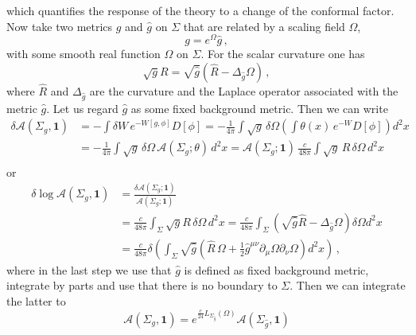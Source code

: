 \documentclass[11pt,a4paper]{article}
\numberwithin{equation}{section}
\newcommand{\one}{\mathbf{1}} %
\begin{document}
%
which quantifies the response of the theory to a change of the conformal factor. Now take two metrics $g$ and $\hat{g}$ on $\Sigma$ that are related by a scaling field $\Omega$, 
%
\begin{equation}\label{eq:gTrafo}
    g = e^{\Omega}\hat{g}\,,
\end{equation}
%
with some smooth real function $\Omega$ on $\Sigma$. For the scalar curvature one has
%
\begin{equation}
    \sqrt{g}R = \sqrt{\hat{g}} \left(\hat{R} - \Delta_{\hat{g}} \Omega \right)\,,
\end{equation}
%
where $\hat{R}$ and $\Delta_{\hat{g}}$ are the curvature and the Laplace operator associated with the metric $\hat{g}$. Let us regard $\hat{g}$ as some fixed background metric. Then we can write
%
\begin{equation*}
\begin{split}
    \delta\mathcal{A}\left(\Sigma_g,\one\right) &= -\int  \delta W\, e^{-W[g,\phi]} D[\phi] = - \frac{1}{4\pi}\int \sqrt{g}\, \delta\Omega \left(\int \theta(x) \,e^{-W} D[\phi] \right) d^2x\\
     &= -\frac{1}{4\pi}\int \sqrt{g}\, \delta\Omega \,\mathcal{A}(\Sigma_g;\theta) \, d^2x = \mathcal{A}(\Sigma_g;\one) \, \frac{c}{48\pi}\int \sqrt{g}\, R\,\delta\Omega \,d^2x  \\
\end{split}
\end{equation*}
%
or
%
\begin{align}
    \delta \log \mathcal{A}(\Sigma_g,\one) &= \frac{\delta \mathcal{A}(\Sigma_{g};\one)}{\mathcal{A}(\Sigma_g;\one)} 
    \nonumber
    \\
    &= \frac{c}{48\pi}\int_\Sigma \sqrt{g}R\, \delta \Omega\, d^2x= \frac{c}{48\pi} \int_{\Sigma} \left(\sqrt{\hat{g}}\hat{R} - \Delta_{\hat{g}}\Omega\right) \delta \Omega d^2x
    \nonumber
    \\
    &= \frac{c}{48\pi} \delta \left(\int _{\Sigma} \sqrt{\hat{g}}\left(\hat{R}\,\Omega + \frac{1}{2} \hat{g}^{\mu\nu}\partial_\mu\Omega\partial_\nu\Omega\right)  d^2x \right)\,,
\end{align}
%
where in the last step we use that $\hat{g}$ is defined as fixed background metric, integrate by parts and use that there is no boundary to $\Sigma$. Then we can integrate the latter to
%
\begin{equation}
    \mathcal{A}(\Sigma_{g},\one) = e^{\frac{c}{24}L_{\Sigma_{\hat{g}}}(\Omega)} \mathcal{A}(\Sigma_{\hat{g}},\one)
\end{equation}
\end{document}
